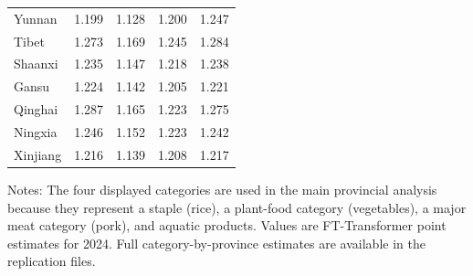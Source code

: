 \documentclass[preprint,12pt,authoryear]{elsarticle}
\begin{document}
\begin{table}[htbp]
\begin{threeparttable}
\begin{tabular*}{\textwidth}{@{\extracolsep{\fill}} l cccc @{}}
Yunnan        & 1.199 & 1.128 & 1.200 & 1.247 \\
Tibet         & 1.273 & 1.169 & 1.245 & 1.284 \\
Shaanxi       & 1.235 & 1.147 & 1.218 & 1.238 \\
Gansu         & 1.224 & 1.142 & 1.205 & 1.221 \\
Qinghai       & 1.287 & 1.165 & 1.223 & 1.275 \\
Ningxia       & 1.246 & 1.152 & 1.223 & 1.242 \\
Xinjiang      & 1.216 & 1.139 & 1.208 & 1.217 \\
\bottomrule
\end{tabular*}
\begin{tablenotes}[flushleft]
\scriptsize
\item Notes: The four displayed categories are used in the main provincial analysis because they represent a staple (rice), a plant-food category (vegetables), a major meat category (pork), and aquatic products. Values are FT-Transformer point estimates for 2024. Full category-by-province estimates are available in the replication files.
\end{tablenotes}
\end{threeparttable}
\end{table}
\end{document}

